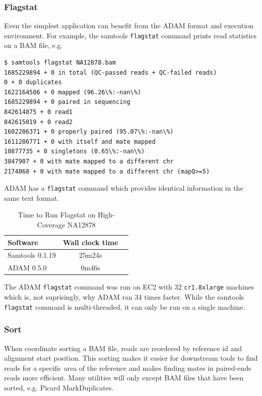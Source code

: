 \documentclass[10pt,twocolumn]{article}
\theoremstyle{plain}
\begin{document}
\subsubsection{Flagstat}
\label{sec:flagstat}

Even the simplest application can benefit from the ADAM format and execution
environment. For example, the samtools \texttt{flagstat} command prints
read statistics on a BAM file, e.g.

\begin{scriptsize}
\begin{verbatim}
$ samtools flagstat NA12878.bam
1685229894 + 0 in total (QC-passed reads + QC-failed reads)
0 + 0 duplicates
1622164506 + 0 mapped (96.26\%:-nan\%)
1685229894 + 0 paired in sequencing
842614875 + 0 read1
842615019 + 0 read2
1602206371 + 0 properly paired (95.07\%:-nan\%)
1611286771 + 0 with itself and mate mapped
10877735 + 0 singletons (0.65\%:-nan\%)
3847907 + 0 with mate mapped to a different chr
2174068 + 0 with mate mapped to a different chr (mapQ>=5)
\end{verbatim}
\end{scriptsize}

ADAM has a \texttt{flagstat} command which provides 
identical information in the same text format.

\begin{table}[h]
\caption{Time to Run Flagstat on High-Coverage NA12878}
\label{tab:time-flagstat}
\begin{center}
\begin{tabular}{| l | c | c |}
\hline
\bf Software  & \bf Wall clock time \\
\hline
Samtools 0.1.19 & 25m24s \\ 
ADAM 0.5.0 & 0m46s \\
\hline
\end{tabular}
\end{center}
\end{table}

The ADAM \texttt{flagstat} command was run on EC2 with 32 \texttt{cr1.8xlarge} machines
which is, not suprisingly, why ADAM ran 34 times faster. While the samtools \texttt{flagstat}
command is multi-threaded, it can only be run on a single machine.

\subsubsection{Sort}
\label{sec:sort}

When coordinate sorting a BAM file, reads are reordered by reference id and alignment start position.
This sorting makes it easier for downstream tools to find reads for a specific area of the reference
and makes finding mates in paired-ends reads more efficient. Many utilities will only except 
BAM files that have been sorted, e.g. Picard MarkDuplicates.
\end{document}
